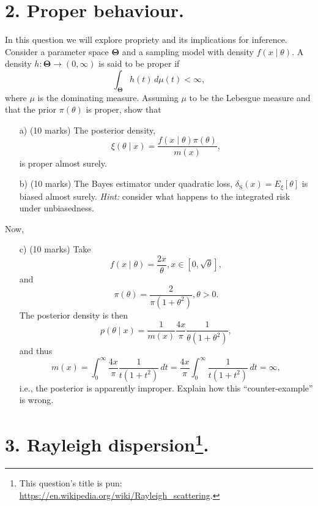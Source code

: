 \documentclass[a4paper,10pt, notitlepage]{report}
\begin{document}
\section*{2. Proper behaviour.}

In this question we will explore propriety and its implications for inference.
Consider a parameter space $\boldsymbol{\Theta}$ and a sampling model with density $f(x \mid \theta)$.
A density $h : \boldsymbol{\Theta} \to (0, \infty)$ is said to be proper if 
\begin{equation*}
 \int_{\boldsymbol{\Theta}} h(t)\,d\mu(t)  < \infty,
\end{equation*}
where $\mu$ is the dominating measure.
Assuming $\mu$ to be the Lebesgue measure and that the prior $\pi(\theta)$ is proper, show that
\begin{itemize}
 \item[a)] (10 marks) The posterior density,
 \begin{equation*}
  \xi(\theta \mid x) = \frac{f(x\mid \theta)\pi(\theta)}{m(x)},
 \end{equation*}
is proper almost surely.
\item[b)] (10 marks) The Bayes estimator under quadratic loss, $\delta_{\text{S}}(x) = E_\xi[\theta]$ is biased almost surely.
\textit{Hint:} consider what happens to the integrated risk under unbiasedness.
\end{itemize}
Now,
\begin{itemize}
 \item[c)] (10 marks) Take
$$f(x \mid \theta) = \frac{2x}{\theta}, x \in [0, \sqrt{\theta}],$$
and 
$$ \pi(\theta) = \frac{2}{\pi (1 +\theta^2)}, \theta > 0.$$
The posterior density is then
\begin{equation*}
 p(\theta \mid x) = \frac{1}{m(x)} \frac{4x}{\pi}\frac{1}{\theta(1 +\theta^2)},
\end{equation*}
 and thus
\begin{equation*}
 m(x) = \int_{0}^\infty \frac{4x}{\pi} \frac{1}{t(1 +t^2)}\,dt = \frac{4x}{\pi} \int_{0}^\infty \frac{1}{t(1 +t^2)}\,dt = \infty,
\end{equation*}
i.e., the posterior is apparently improper.
Explain how this ``counter-example'' is wrong.
\end{itemize}

\section*{3. Rayleigh dispersion\footnote{This question's title is pun: \url{https://en.wikipedia.org/wiki/Rayleigh_scattering}.}.}
\end{document}
